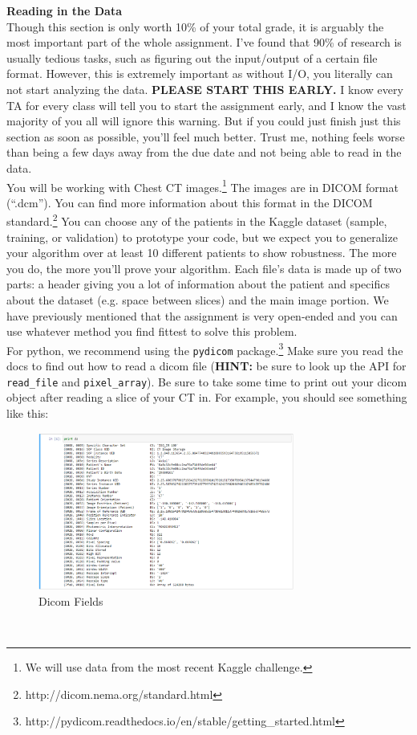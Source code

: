 \documentclass[10pt]{article}
\begin{document}
\clearpage
\noindent \Large \textbf{Reading in the Data} \normalsize \\
\noindent\makebox[\linewidth]{\rule{\textwidth}{0.4pt}}
Though this section is only worth 10\% of your total grade, it is arguably the most important part of the whole assignment.  I've found that 90\% of research is usually tedious tasks, such as figuring out the input/output of a certain file format.  However, this is extremely important as without I/O, you literally can not start analyzing the data.  \textbf{PLEASE START THIS EARLY.}  I know every TA for every class will tell you to start the assignment early, and I know the vast majority of you all will ignore this warning.  But if you could just finish just this section as soon as possible, you'll feel much better.  Trust me, nothing feels worse than being a few days away from the due date and not being able to read in the data.\\
\indent You will be working with Chest CT images.\footnote{We will use data from the most recent Kaggle challenge.}  The images are in DICOM format (``.dcm'').  You can find more information about this format in the DICOM standard.\footnote{http://dicom.nema.org/standard.html}  You can choose any of the patients in the Kaggle dataset (sample, training, or validation) to prototype your code, but we expect you to generalize your algorithm over at least 10 different patients to show robustness.  The more you do, the more you'll prove your algorithm.  Each file's data is made up of two parts: a header giving you a lot of information about the patient and specifics about the dataset (e.g. space between slices) and the main image portion.  We have previously mentioned that the assignment is very open-ended and you can use whatever method you find fittest to solve this problem.\\
\indent For python, we recommend using the \texttt{pydicom} package.\footnote{http://pydicom.readthedocs.io/en/stable/getting\_started.html}  Make sure you read the docs to find out how to read a dicom file (\textbf{HINT:} be sure to look up the API for \texttt{read\_file} and \texttt{pixel\_array}).  Be sure to take some time to print out your dicom object after reading a slice of your CT in.  For example, you should see something like this:\\
\begin{figure}[h]
	\centering
	\includegraphics[width = 0.75\textwidth]{figures/dicom_fields}
	\caption{Dicom Fields}
	\label{fig:DCM}
\end{figure}\\
\end{document}
